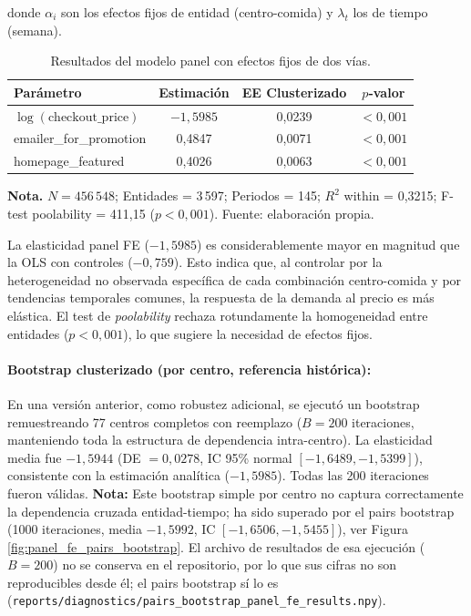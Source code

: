 \documentclass[doc, a4paper, biblatex, floatsintext, longtable, babel]{apa7}
\begin{document}
donde $\alpha_i$ son los efectos fijos de entidad (centro-comida) y $\lambda_t$ los de tiempo (semana).

\begin{table}[!htbp]
\centering
\caption{Resultados del modelo panel con efectos fijos de dos v\'ias.}
\label{tab:panel_fe_resultados}
\footnotesize
\begin{threeparttable}
\begin{tabular}{lccc}
\toprule
Par\'ametro & Estimaci\'on & EE Clusterizado & $p$-valor \\
\midrule
$\log(\text{checkout\_price})$ & \textbf{$-1,5985$} & 0,0239 & $<0,001$ \\
emailer\_for\_promotion & 0,4847 & 0,0071 & $<0,001$ \\
homepage\_featured & 0,4026 & 0,0063 & $<0,001$ \\
\bottomrule
\end{tabular}
\begin{tablenotes}
\footnotesize
\item \textbf{Nota.} $N = 456\,548$; Entidades = 3\,597; Periodos = 145; $R^2$ within = 0,3215; F-test poolability = 411,15 ($p<0,001$). Fuente: elaboración propia.
\end{tablenotes}
\end{threeparttable}
\end{table}

La elasticidad panel FE ($-1,5985$) es considerablemente mayor en magnitud que la OLS con controles ($-0,759$). Esto indica que, al controlar por la heterogeneidad no observada espec\'ifica de cada combinaci\'on centro-comida y por tendencias temporales comunes, la respuesta de la demanda al precio es m\'as el\'astica. El test de \textit{poolability} rechaza rotundamente la homogeneidad entre entidades ($p<0,001$), lo que sugiere la necesidad de efectos fijos.

\paragraph{Bootstrap clusterizado (por centro, referencia histórica):} En una versión anterior, como robustez adicional, se ejecut\'o un bootstrap remuestreando 77 centros completos con reemplazo ($B=200$ iteraciones, manteniendo toda la estructura de dependencia intra-centro). La elasticidad media fue $-1,5944$ (DE $=0,0278$, IC 95\% normal $[-1,6489, -1,5399]$), consistente con la estimación analítica ($-1,5985$). Todas las 200 iteraciones fueron válidas. \textbf{Nota:} Este bootstrap simple por centro no captura correctamente la dependencia cruzada entidad-tiempo; ha sido superado por el pairs bootstrap (1000 iteraciones, media $-1,5992$, IC $[-1,6506, -1,5455]$), ver Figura \ref{fig:panel_fe_pairs_bootstrap}. El archivo de resultados de esa ejecución ($B=200$) no se conserva en el repositorio, por lo que sus cifras no son reproducibles desde él; el pairs bootstrap sí lo es (\texttt{reports/diagnostics/pairs\_bootstrap\_panel\_fe\_results.npy}).
\end{document}
